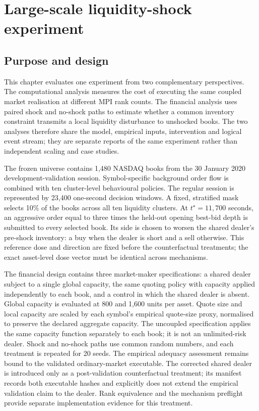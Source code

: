 \section{Large-scale liquidity-shock experiment}
\label{sec:liquidity-shock-experiment}

\subsection{Purpose and design}

This chapter evaluates one experiment from two complementary perspectives.
The computational analysis measures the cost of executing the same coupled
market realisation at different MPI rank counts.  The financial analysis uses
paired shock and no-shock paths to estimate whether a common inventory
constraint transmits a local liquidity disturbance to unshocked books.  The
two analyses therefore share the model, empirical inputs, intervention and
logical event stream; they are separate reports of the same experiment rather
than independent scaling and case studies.

The frozen universe contains 1,480 NASDAQ books from the 30 January 2020
development-validation session.  Symbol-specific background order flow is
combined with ten cluster-level behavioural policies.  The regular session is
represented by 23,400 one-second decision windows.  A fixed, stratified mask
selects 10\% of the books across all ten liquidity clusters.  At
$t^\star=11{,}700$ seconds, an aggressive order equal to three times the
held-out opening best-bid depth is submitted to every selected book.  Its side
is chosen to worsen the shared dealer's pre-shock inventory: a buy when the
dealer is short and a sell otherwise.  This reference dose and direction are
fixed before the counterfactual treatments; the exact asset-level dose vector
must be identical across mechanisms.

The financial design contains three market-maker specifications: a shared
dealer subject to a single global capacity, the same quoting policy with
capacity applied independently to each book, and a control in which the shared
dealer is absent.  Global capacity is evaluated at 800 and 1,600 units per
asset.  Quote size and local capacity are scaled by each symbol's empirical
quote-size proxy, normalised to preserve the declared aggregate capacity.
The uncoupled specification applies the same capacity function separately to
each book; it is not an unlimited-risk dealer.  Shock and no-shock paths use
common random numbers, and each treatment is repeated for 20 seeds.
The empirical adequacy assessment remains bound to the validated
ordinary-market executable.  The corrected shared dealer is introduced only
as a post-validation counterfactual treatment; its manifest records both
executable hashes and explicitly does not extend the empirical validation
claim to the dealer.  Rank equivalence and the mechanism preflight provide
separate implementation evidence for this treatment.

